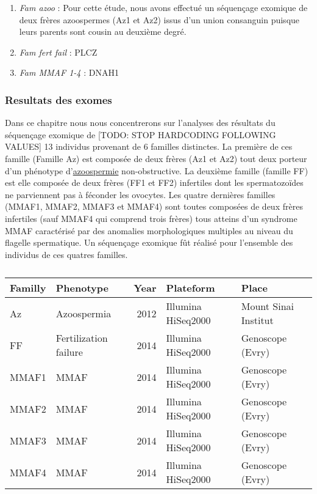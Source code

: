 \documentclass[12pt,twoside]{reedthesis}
\providecommand{\tightlist}{%
  \setlength{\itemsep}{0pt}\setlength{\parskip}{0pt}}
\theoremstyle{definition}
\theoremstyle{definition}
\theoremstyle{remark}
\begin{document}
  \begin{enumerate}
  \def\labelenumi{\arabic{enumi}.}
  \tightlist
  \item
    \emph{Fam azoo} : Pour cette étude, nous avons effectué un séquençage
    exomique de deux frères azoospermes (Az1 et Az2) issus d'un union
    consanguin puisque leurs parents sont cousin au deuxième degré. 
  \item
    \emph{Fam fert fail} : PLCZ
  \item
    \emph{Fam MMAF 1-4} : DNAH1
  \end{enumerate}
  
  \subsubsection{Resultats des exomes}\label{resultats-des-exomes}
  
  Dans ce chapitre nous nous concentrerons sur l'analyses des résultats du
  séquençage exomique de {[}TODO: STOP HARDCODING FOLLOWING VALUES{]} 13
  individus provenant de 6 familles distinctes. La première de ces famille
  (Famille Az) est composée de deux frères (Az1 et Az2) tout deux porteur
  d'un phénotype d'\protect\hyperlink{infquant}{azoospermie}
  non-obstructive. La deuxième famille (famille FF) est elle composée de
  deux frères (FF1 et FF2) infertiles dont les spermatozoïdes ne
  parviennent pas à féconder les ovocytes. Les quatre dernières familles
  (MMAF1, MMAF2, MMAF3 et MMAF4) sont toutes composées de deux frères
  infertiles (sauf MMAF4 qui comprend trois frères) tous atteins d'un
  syndrome MMAF caractérisé par des anomalies morphologiques multiples au
  niveau du flagelle spermatique. Un séquençage exomique fût réalisé pour
  l'ensemble des individus de ces quatres familles.
  
  \begin{table}
  
  \caption{\label{tab:unnamed-chunk-1}}
  \centering
  \begin{tabular}[t]{l|l|r|l|l}
  \hline
  Familly & Phenotype & Year & Plateform & Place\\
  \hline
  Az & Azoospermia & 2012 & Illumina HiSeq2000 & Mount Sinai Institut\\
  \hline
  FF & Fertilization failure & 2014 & Illumina HiSeq2000 & Genoscope (Evry)\\
  \hline
  MMAF1 & MMAF & 2014 & Illumina HiSeq2000 & Genoscope (Evry)\\
  \hline
  MMAF2 & MMAF & 2014 & Illumina HiSeq2000 & Genoscope (Evry)\\
  \hline
  MMAF3 & MMAF & 2014 & Illumina HiSeq2000 & Genoscope (Evry)\\
  \hline
  MMAF4 & MMAF & 2014 & Illumina HiSeq2000 & Genoscope (Evry)\\
  \hline
  \end{tabular}
  \end{table}
  
\end{document}
